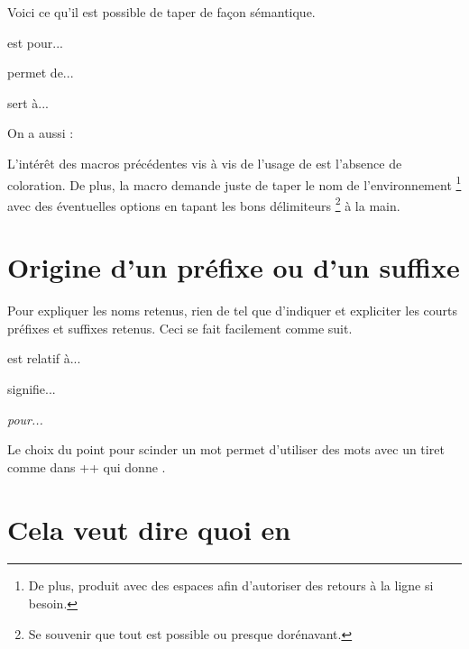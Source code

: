 \documentclass[12pt, a4paper]{article}
\begin{document}
Voici ce qu'il est possible de taper de façon sémantique.

\begin{bdoclatex}[sbs]
 est pour...

 permet de...

 sert à...

On a aussi :

\end{bdoclatex}


\begin{bdocrem}
    L'intérêt des macros précédentes vis à vis de l'usage de  est l'absence de coloration.
    De plus, la macro  demande juste de taper le nom de l'environnement
    \footnote{
        De plus,  produit  avec des espaces afin d'autoriser des retours à la ligne si besoin.
    }
    avec des éventuelles options en tapant les bons délimiteurs
    \footnote{
        Se souvenir que tout est possible ou presque dorénavant.
    }
    à la main.
\end{bdocrem}




\section{Origine d'un préfixe ou d'un suffixe}

Pour expliquer les noms retenus, rien de tel que d'indiquer et expliciter les courts préfixes et suffixes retenus. Ceci se fait facilement comme suit.

\begin{bdoclatex}[sbs]
 est relatif à...

 signifie...

\emph{ pour...}
\end{bdoclatex}


\begin{bdocrem}
    Le choix du point pour scinder un mot permet d'utiliser des mots avec un tiret comme dans \bdocinlatex++ qui donne .
\end{bdocrem}


\section{Cela veut dire quoi en }
\end{document}
